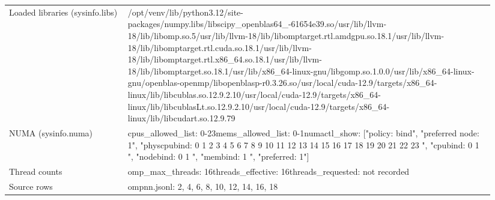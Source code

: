 \begin{longtable}{>{\raggedright\arraybackslash}p{0.23\linewidth}>{\raggedright\arraybackslash}p{0.71\linewidth}}
Loaded libraries (sysinfo.libs) & /\allowbreak{}opt/\allowbreak{}venv/\allowbreak{}lib/\allowbreak{}python3.12/\allowbreak{}site-packages/\allowbreak{}numpy.libs/\allowbreak{}libscipy\_\allowbreak{}openblas64\_\allowbreak{}-61654e39.so\newline /\allowbreak{}usr/\allowbreak{}lib/\allowbreak{}llvm-18/\allowbreak{}lib/\allowbreak{}libomp.so.5\newline /\allowbreak{}usr/\allowbreak{}lib/\allowbreak{}llvm-18/\allowbreak{}lib/\allowbreak{}libomptarget.rtl.amdgpu.so.18.1\newline /\allowbreak{}usr/\allowbreak{}lib/\allowbreak{}llvm-18/\allowbreak{}lib/\allowbreak{}libomptarget.rtl.cuda.so.18.1\newline /\allowbreak{}usr/\allowbreak{}lib/\allowbreak{}llvm-18/\allowbreak{}lib/\allowbreak{}libomptarget.rtl.x86\_\allowbreak{}64.so.18.1\newline /\allowbreak{}usr/\allowbreak{}lib/\allowbreak{}llvm-18/\allowbreak{}lib/\allowbreak{}libomptarget.so.18.1\newline /\allowbreak{}usr/\allowbreak{}lib/\allowbreak{}x86\_\allowbreak{}64-linux-gnu/\allowbreak{}libgomp.so.1.0.0\newline /\allowbreak{}usr/\allowbreak{}lib/\allowbreak{}x86\_\allowbreak{}64-linux-gnu/\allowbreak{}openblas-openmp/\allowbreak{}libopenblasp-r0.3.26.so\newline /\allowbreak{}usr/\allowbreak{}local/\allowbreak{}cuda-12.9/\allowbreak{}targets/\allowbreak{}x86\_\allowbreak{}64-linux/\allowbreak{}lib/\allowbreak{}libcublas.so.12.9.2.10\newline /\allowbreak{}usr/\allowbreak{}local/\allowbreak{}cuda-12.9/\allowbreak{}targets/\allowbreak{}x86\_\allowbreak{}64-linux/\allowbreak{}lib/\allowbreak{}libcublasLt.so.12.9.2.10\newline /\allowbreak{}usr/\allowbreak{}local/\allowbreak{}cuda-12.9/\allowbreak{}targets/\allowbreak{}x86\_\allowbreak{}64-linux/\allowbreak{}lib/\allowbreak{}libcudart.so.12.9.79 \\
NUMA (sysinfo.numa) & cpus\_\allowbreak{}allowed\_\allowbreak{}list: 0-23\newline mems\_\allowbreak{}allowed\_\allowbreak{}list: 0-1\newline numactl\_\allowbreak{}show: ["policy: bind", "preferred node: 1", "physcpubind: 0 1 2 3 4 5 6 7 8 9 10 11 12 13 14 15 16 17 18 19 20 21 22 23 ", "cpubind: 0 1 ", "nodebind: 0 1 ", "membind: 1 ", "preferred: 1"] \\
Thread counts & omp\_\allowbreak{}max\_\allowbreak{}threads: 16\newline threads\_\allowbreak{}effective: 16\newline threads\_\allowbreak{}requested: not recorded \\
Source rows & ompnn.jsonl: 2, 4, 6, 8, 10, 12, 14, 16, 18 \\
\end{longtable}
